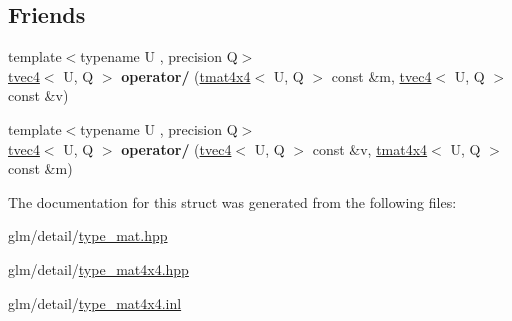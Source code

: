 \subsection*{Friends}
\begin{DoxyCompactItemize}
\item 
\hypertarget{structglm_1_1tmat4x4_a4d1472f6e50839c280a3a7f32396b3f1}{{\footnotesize template$<$typename U , precision Q$>$ }\\\hyperlink{structglm_1_1tvec4}{tvec4}$<$ U, Q $>$ {\bfseries operator/} (\hyperlink{structglm_1_1tmat4x4}{tmat4x4}$<$ U, Q $>$ const \&m, \hyperlink{structglm_1_1tvec4}{tvec4}$<$ U, Q $>$ const \&v)}\label{structglm_1_1tmat4x4_a4d1472f6e50839c280a3a7f32396b3f1}

\item 
\hypertarget{structglm_1_1tmat4x4_a786a67d54520cab5d9ecd91530012ac2}{{\footnotesize template$<$typename U , precision Q$>$ }\\\hyperlink{structglm_1_1tvec4}{tvec4}$<$ U, Q $>$ {\bfseries operator/} (\hyperlink{structglm_1_1tvec4}{tvec4}$<$ U, Q $>$ const \&v, \hyperlink{structglm_1_1tmat4x4}{tmat4x4}$<$ U, Q $>$ const \&m)}\label{structglm_1_1tmat4x4_a786a67d54520cab5d9ecd91530012ac2}

\end{DoxyCompactItemize}


The documentation for this struct was generated from the following files\-:\begin{DoxyCompactItemize}
\item 
glm/detail/\hyperlink{type__mat_8hpp}{type\-\_\-mat.\-hpp}\item 
glm/detail/\hyperlink{type__mat4x4_8hpp}{type\-\_\-mat4x4.\-hpp}\item 
glm/detail/\hyperlink{type__mat4x4_8inl}{type\-\_\-mat4x4.\-inl}\end{DoxyCompactItemize}
